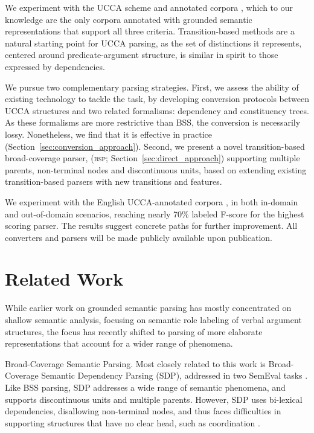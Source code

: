 \documentclass[11pt,letterpaper]{article}
\makeatletter
\newcommand{\secref}[1]{Section~\ref{#1}}
\renewcommand{\paragraph}{
  \@startsection{paragraph}{4}
  {\z@}{.3ex \@plus .3ex \@minus .2ex}{-1em}
  {\normalfont\normalsize\bfseries}
}
\makeatother
\begin{document}
We experiment with the UCCA scheme and annotated corpora \cite{abend2013universal},
which to our knowledge are the only corpora annotated with grounded semantic
representations that support all three criteria.
Transition-based methods are a natural starting point for UCCA parsing,
as the set of distinctions it represents, centered around predicate-argument
structure, is similar in spirit to those expressed by dependencies.

We pursue two complementary parsing strategies.
First, we assess the ability of existing technology to tackle the task,
by developing conversion protocols between UCCA structures and two related formalisms:
dependency and constituency trees.
As these formalisms are more restrictive than BSS, the conversion
is necessarily lossy. Nonetheless, we find that it is effective
in practice (\secref{sec:conversion_approach}).
Second, we present a novel transition-based broad-coverage parser,
(\textsc{bsp}; \secref{sec:direct_approach})
supporting multiple parents, non-terminal nodes and discontinuous units,
based on extending existing transition-based parsers
with new transitions and features.

We experiment with the English UCCA-annotated corpora \cite{abend2013universal},
in both in-domain and out-of-domain scenarios, reaching
nearly 70\% labeled F-score for the highest scoring parser.
The results suggest concrete paths for further improvement.
All converters and parsers will be made publicly available upon publication.


\vspace{-.1cm}

\section{Related Work}\label{sec:related_work}
While earlier work on grounded semantic parsing has mostly concentrated on shallow semantic analysis,
focusing on semantic role labeling of verbal argument structures,
the focus has recently shifted to parsing of more elaborate representations that account
for a wider range of phenomena.


\paragraph{Broad-Coverage Semantic Parsing.}
Most closely related to this work is Broad-Coverage Semantic Dependency Parsing (SDP),
addressed in two SemEval tasks \cite{oepen2014semeval,oepen2015semeval}.
Like BSS parsing, SDP addresses a wide range of semantic phenomena,
and supports discontinuous units and multiple parents. However, SDP uses
bi-lexical dependencies, disallowing non-terminal nodes, and thus faces difficulties in supporting
structures that have no clear head, such as coordination \cite{Ivanova2012who}.
\end{document}
